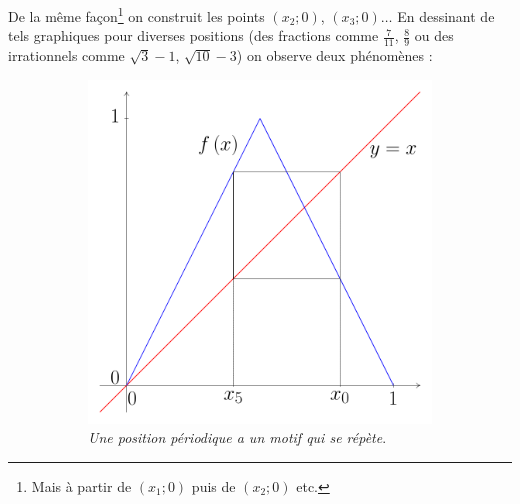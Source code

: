 \documentclass[a4paper,french,12pt]{article}
\begin{document}
De la même façon\footnote{Mais à partir de $\left(x_1;0\right)$ puis de $\left(x_2;0\right)$ etc.} on construit les points $\left(x_2;0\right)$, $\left(x_3;0\right)\ldots$ En dessinant de tels graphiques pour diverses positions (des fractions comme $\frac{7}{11}$, $\frac{8}{9}$ ou des irrationnels comme $\sqrt{3}-1$, $\sqrt{10}-3$) on observe deux phénomènes :

\vspace*{-0.75cm}
\hypertarget{4}{}
\begin{center}
\begin{figure}[H]
  \begin{subfigure}[b]{0.4\textwidth}
    \includegraphics[scale=0.45]{../TeXGraph/Pdf/courbe_suite_phenomene_2.pdf}
    \caption{\emph{Une position périodique a un motif qui se répète}.}
    \label{fig:f1}
  \end{subfigure}
  \hfill
  \begin{subfigure}[b]{0.4\textwidth}

\end{subfigure}
\end{figure}
\end{center}
\end{document}
